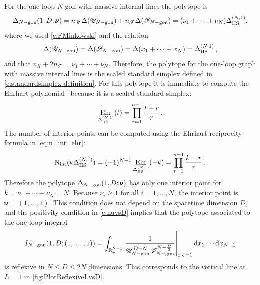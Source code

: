 \documentclass[12pt,a4paper]{article}
\theoremstyle{plain}
\theoremstyle{remark}
\newcommand{\nprops}{N}
\DeclareMathOperator{\nint}{N_{\mathrm{int}}}
\newcommand{\dd}{\mathrm{d}}
\newcommand{\cU}{\mathscr {U}}
\newcommand{\cF}{\mathscr {F}}
\newcommand{\cL}{\mathscr {L}}
\newcommand{\undernotation}[1]{\pmb{#1}}
\newcommand{\Newton}{\Delta}
\DeclareMathOperator{\ehr}{Ehr}
\newcommand{\simplexwithpars}[1]{\Newton_{\text{HS}}^{(#1)}}
\begin{document}
For the one-loop $\nprops$-gon with massive internal lines the polytope is  
	\begin{equation}\label{e:NewtonUFoneloop}
		\Delta_{\nprops-\rm gon}(1,D;\undernotation{\nu})=
			n_{\cU}\Newton(\cU_{\nprops-\rm gon})+n_\cF \Newton(\cF_{\nprops-\rm gon})=
			(\nu_1+\cdots+\nu_\nprops)\simplexwithpars{\nprops,1},
		\end{equation}
where we used \cref{e:FMinkowski} and the relation
\begin{equation}
\Newton(\cU_{\nprops-\rm
  gon})=\Newton(\cL_{\nprops-\rm
  gon})=\Newton(x_1+\cdots+x_{\nprops})=\simplexwithpars{\nprops,1}\,,
  \end{equation}
and that $n_\cU+2n_\cF=\nu_1+\cdots+\nu_\nprops$.
Therefore, the polytope for the one-loop graph with massive internal lines is the scaled standard simplex defined in \cref{e:standardsimplex-definition}. For this polytope it is immediate to compute the
Ehrhart polynomial~\cite{Beck:2015} because it is a scaled standard simplex:
\begin{equation}
  \ehr_{ \simplexwithpars{\nprops,1}}(t)=
  \prod_{r=1}^{n-1}{t+r\over r}\,. 
\end{equation}
The number of interior points can be computed using the Ehrhart
reciprocity formula in \cref{eq:n_int_ehr}:
\begin{equation}
  	\nint(k\simplexwithpars{\nprops,1}) =
        (-1)^{\nprops-1} \ehr_{  \simplexwithpars{\nprops,1}}(-k)=\prod_{r=1}^{n-1}{k-r\over r}\,.
      \end{equation}
Therefore the polytope $\Delta_{\nprops-\rm gon}(1,D;\undernotation{\nu})$
has only one interior point for
$k=\nu_1+\cdots+\nu_\nprops=\nprops$. Because $\nu_i\geq1$ for all
$i=1,\dots,\nprops$,  the interior point is
$\undernotation{\nu}=(1,\dots,1)$. This condition does not depend on the
spacetime dimension $D$, and the positivity  condition in
\cref{e:nuvsD} implies that the polytope associated to the one-loop
integral
	\begin{equation}\label{e:UFoneloop}
			 I_{\nprops-\rm gon}(1,D;(1,\dots,1))= \int_{\mathbb R_+^{\nprops-1}} \left. {1\over \cU_{\nprops-\rm
					gon}^{D-\nprops}\cF_{\nprops-\rm gon}^{\nprops-{D\over2}}}\right|_{x_\nprops=1} \dd x_1\cdots \dd x_{\nprops-1}
                                  \end{equation}
                                  is 
reflexive in $\nprops \leq D\leq 2\nprops $ dimensions. This corresponds to the vertical line at $L=1$ in
\cref{fig:PlotReflexiveLvsD}.
\end{document}
